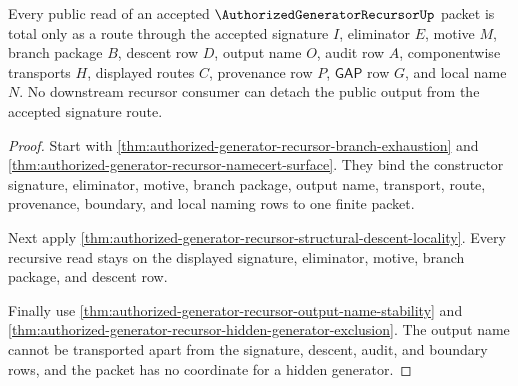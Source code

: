 \begin{theorem}
\label{thm:authorized-generator-recursor-signature-route-totality}
Every public read of an accepted $\AuthorizedGeneratorRecursorUp$ packet is
total only as a route through the accepted signature $I$, eliminator $E$,
motive $M$, branch package $B$, descent row $D$, output name $O$, audit row
$A$, componentwise transports $H$, displayed routes $C$, provenance row $P$,
$\mathsf{GAP}$ row $G$, and local name $N$. No downstream recursor consumer can
detach the public output from the accepted signature route.
\end{theorem}
\begin{proof}
Start with \autoref{thm:authorized-generator-recursor-branch-exhaustion} and
\autoref{thm:authorized-generator-recursor-namecert-surface}. They bind the
constructor signature, eliminator, motive, branch package, output name,
transport, route, provenance, boundary, and local naming rows to one finite
packet.

Next apply \autoref{thm:authorized-generator-recursor-structural-descent-locality}.
Every recursive read stays on the displayed signature, eliminator, motive,
branch package, and descent row.

Finally use \autoref{thm:authorized-generator-recursor-output-name-stability}
and \autoref{thm:authorized-generator-recursor-hidden-generator-exclusion}. The
output name cannot be transported apart from the signature, descent, audit, and
boundary rows, and the packet has no coordinate for a hidden generator.
\end{proof}

